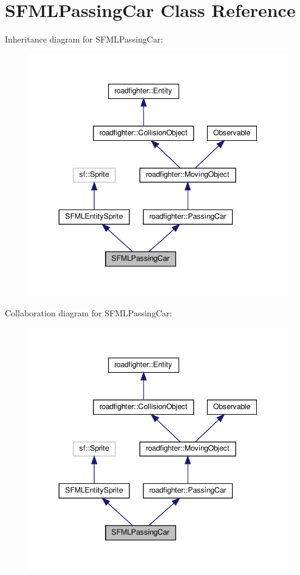\hypertarget{classSFMLPassingCar}{}\section{S\+F\+M\+L\+Passing\+Car Class Reference}
\label{classSFMLPassingCar}


Inheritance diagram for S\+F\+M\+L\+Passing\+Car\+:\nopagebreak
\begin{figure}[H]
\begin{center}
\leavevmode
\includegraphics[width=344pt]{classSFMLPassingCar__inherit__graph}
\end{center}
\end{figure}


Collaboration diagram for S\+F\+M\+L\+Passing\+Car\+:\nopagebreak
\begin{figure}[H]
\begin{center}
\leavevmode
\includegraphics[width=344pt]{classSFMLPassingCar__coll__graph}
\end{center}
\end{figure}

